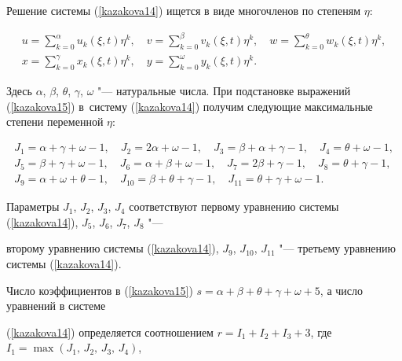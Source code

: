 Решение системы (\ref{kazakova14}) ищется в виде многочленов по степеням $\eta$:

\begin{equation}\label{kazakova15}

\begin{array}{c}

u=\sum\limits_{k=0}^{\alpha} u_{k}(\xi,t) \eta ^k,\quad v=\sum\limits_{k=0}^{\beta} v_{k}(\xi,t) \eta ^k,\quad

w=\sum\limits_{k=0}^{\theta} w_{k}(\xi,t) \eta ^k,\\

x=\sum\limits_{k=0}^{\gamma} x_k(\xi,t) \eta ^k,\quad y=\sum\limits_{k=0}^\omega y_k(\xi,t) {\eta}^k.

\end{array}

\end{equation}

Здесь  $\alpha$, $\beta$, $\theta$, $\gamma$, $\omega$ "--- натуральные числа. При подстановке выражений  (\ref{kazakova15}) в~систему (\ref{kazakova14}) получим следующие максимальные степени переменной  ${\eta}$:

\begin{gather*}

J_1=\alpha+\gamma+\omega-1,\quad  J_2=2\alpha+\omega-1,\quad  J_3=\beta+\alpha+\gamma-1,\quad  J_4=\theta+\omega-1,\\

J_5=\beta+\gamma+\omega-1,\quad  J_6=\alpha+\beta+\omega-1,\quad  J_7=2\beta+\gamma-1,\quad  J_8=\theta+\gamma-1,\\

J_{9}=\alpha+\omega+\theta-1,\quad J_{10}=\beta+\theta+\gamma-1,\quad  J_{11}=\theta+\gamma+\omega-1.

\end{gather*}





Параметры $J_1$, $J_2$, $J_3$, $J_4$  соответствуют первому уравнению системы (\ref{kazakova14}), $J_5$, $J_6$, $J_7$, $J_8$ "---

второму уравнению системы  (\ref{kazakova14}), $J_9$, $J_{10}$, $J_{11}$ "--- третьему уравнению системы  (\ref{kazakova14}).

Число коэффициентов в (\ref{kazakova15})  $s=\alpha+\beta+\theta+\gamma+\omega+5$, \linebreak а число уравнений в системе

(\ref{kazakova14}) определяется соотношением $r=I_1+I_2+I_3+3$, где $I_1=\max(J_1,\,J_2,\,J_3,\,J_4)$,

